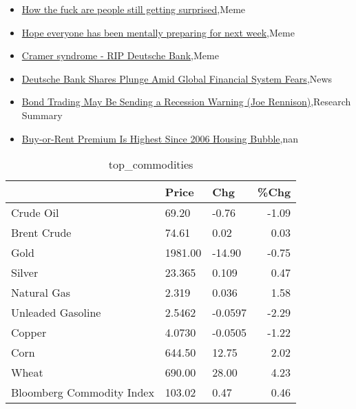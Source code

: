 \documentclass{article}%
\begin{document}
%
\begin{itemize}%
\item%
\href{https://reddit.com/r/wallstreetbets/comments/121hxas/how\_the\_fuck\_are\_people\_still\_getting\_surprised/}{How the fuck are people still getting surprised},Meme%
\item%
\href{https://reddit.com/r/wallstreetbets/comments/121hu62/hope\_everyone\_has\_been\_mentally\_preparing\_for/}{Hope everyone has been mentally preparing for next week},Meme%
\item%
\href{https://reddit.com/r/wallstreetbets/comments/121hlip/cramer\_syndrome\_rip\_deutsche\_bank/}{Cramer syndrome - RIP Deutsche Bank},Meme%
\item%
\href{https://reddit.com/r/Economics/comments/12171hq/deutsche\_bank\_shares\_plunge\_amid\_global\_financial/}{Deutsche Bank Shares Plunge Amid Global Financial System Fears},News%
\item%
\href{https://reddit.com/r/Economics/comments/1215pws/bond\_trading\_may\_be\_sending\_a\_recession\_warning/}{Bond Trading May Be Sending a Recession Warning (Joe Rennison)},Research Summary%
\item%
\href{https://reddit.com/r/Economics/comments/12110vv/buyorrent\_premium\_is\_highest\_since\_2006\_housing/}{Buy-or-Rent Premium Is Highest Since 2006 Housing Bubble},nan%
\end{itemize}%


\begin{table}[htbp]%
\caption{top\_commodities}%
\centering%
\begin{adjustbox}{width=1\textwidth}%
\begin{tabular}{lllr}
\toprule
                          &   Price &     Chg &  \%Chg \\
\midrule
               Crude Oil  &   69.20 &   -0.76 & -1.09 \\
             Brent Crude  &   74.61 &    0.02 &  0.03 \\
                    Gold  & 1981.00 &  -14.90 & -0.75 \\
                  Silver  &  23.365 &   0.109 &  0.47 \\
             Natural Gas  &   2.319 &   0.036 &  1.58 \\
       Unleaded Gasoline  &  2.5462 & -0.0597 & -2.29 \\
                  Copper  &  4.0730 & -0.0505 & -1.22 \\
                    Corn  &  644.50 &   12.75 &  2.02 \\
                   Wheat  &  690.00 &   28.00 &  4.23 \\
Bloomberg Commodity Index &  103.02 &    0.47 &  0.46 \\
\bottomrule
\end{tabular}
%
\end{adjustbox}%
\end{table}
\end{document}
